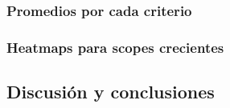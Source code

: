 \subsubsection{Promedios por cada criterio}

\subsubsection{Heatmaps para scopes crecientes}


\subsection{Discusión y conclusiones}


\newpage

